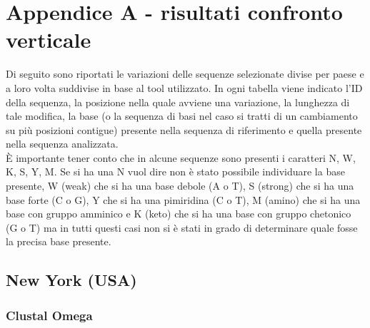 \documentclass[a4paper,10pt]{article}
\begin{document}
\section{Appendice A - risultati confronto verticale}
Di seguito sono riportati le variazioni delle sequenze selezionate divise per paese e a loro volta suddivise in base al tool utilizzato. In ogni tabella viene indicato l'ID della sequenza, la posizione nella quale avviene una variazione, la lunghezza di tale modifica,  la base (o la sequenza di basi nel caso si tratti di un cambiamento su più posizioni contigue) presente nella sequenza di riferimento e quella presente nella sequenza analizzata. \\
È importante tener conto che in alcune sequenze sono presenti i caratteri N, W, K, S, Y, M. Se si ha una N vuol dire non è stato possibile individuare la base presente, W (weak) che si ha una base debole (A o T), S (strong) che si ha una base forte (C o G), Y che si ha una pimiridina (C o T), M (amino) che si ha una base con gruppo amminico e K (keto) che si ha una base con gruppo chetonico (G o T) ma in tutti questi casi non si è stati in grado di determinare quale fosse la precisa base presente.


\subsection{New York (USA)}
\subsubsection{Clustal Omega}
\end{document}
